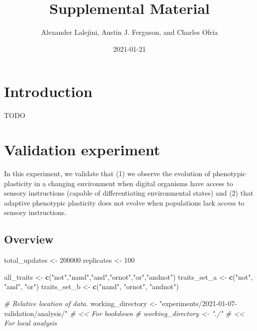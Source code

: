 \documentclass[]{book}
\title{Supplemental Material}
\author{Alexander Lalejini, Austin J. Ferguson, and Charles Ofria}
\date{2021-01-21}
\newenvironment{Shaded}{\begin{snugshade}}{\end{snugshade}}
\newcommand{\CommentTok}[1]{\textcolor[rgb]{0.56,0.35,0.01}{\textit{#1}}}
\newcommand{\DecValTok}[1]{\textcolor[rgb]{0.00,0.00,0.81}{#1}}
\newcommand{\KeywordTok}[1]{\textcolor[rgb]{0.13,0.29,0.53}{\textbf{#1}}}
\newcommand{\NormalTok}[1]{#1}
\newcommand{\StringTok}[1]{\textcolor[rgb]{0.31,0.60,0.02}{#1}}
\begin{document}
\maketitle

{
\setcounter{tocdepth}{1}
\tableofcontents
}
\hypertarget{introduction}{%
\chapter{Introduction}\label{introduction}}

TODO

\hypertarget{validation-experiment}{%
\chapter{Validation experiment}\label{validation-experiment}}

In this experiment, we validate that
(1) we observe the evolution of phenotypic plasticity in a changing environment when digital organisms have access to sensory instructions (capable of differentiating environmental states)
and (2) that adaptive phenotypic plasticity does not evolve when populations lack access to sensory instructions.

\hypertarget{overview}{%
\section{Overview}\label{overview}}

\begin{Shaded}
\begin{Highlighting}[]
\NormalTok{total_updates <-}\StringTok{ }\DecValTok{200000}
\NormalTok{replicates <-}\StringTok{ }\DecValTok{100}

\NormalTok{all_traits <-}\StringTok{ }\KeywordTok{c}\NormalTok{(}\StringTok{"not"}\NormalTok{,}\StringTok{"nand"}\NormalTok{,}\StringTok{"and"}\NormalTok{,}\StringTok{"ornot"}\NormalTok{,}\StringTok{"or"}\NormalTok{,}\StringTok{"andnot"}\NormalTok{)}
\NormalTok{traits_set_a <-}\StringTok{ }\KeywordTok{c}\NormalTok{(}\StringTok{"not"}\NormalTok{, }\StringTok{"and"}\NormalTok{, }\StringTok{"or"}\NormalTok{)}
\NormalTok{traits_set_b <-}\StringTok{ }\KeywordTok{c}\NormalTok{(}\StringTok{"nand"}\NormalTok{, }\StringTok{"ornot"}\NormalTok{, }\StringTok{"andnot"}\NormalTok{)}

\CommentTok{# Relative location of data.}
\NormalTok{working_directory <-}\StringTok{ "experiments/2021-01-07-validation/analysis/"} \CommentTok{# << For bookdown}
\CommentTok{# working_directory <- "./"                                              # << For local analysis}
\end{Highlighting}
\end{Shaded}
\end{document}
